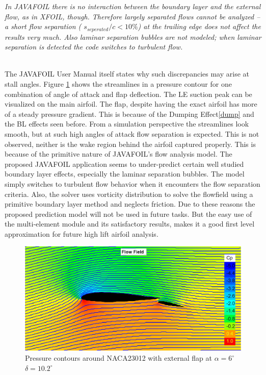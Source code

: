\documentclass[main.tex]{subfiles}
\begin{document}
\vspace{0.35cm}\begin{tcolorbox}[colback=gray!5!white,colframe=gray!75!black]
\textit{In JAVAFOIL there is no interaction between the boundary layer and the external flow, as in XFOIL, though. Therefore largely separated flows cannot be analyzed – a short flow separation ( $s_{seperated}/c < 10\% $) at the trailing edge does not affect the results very much. Also laminar separation bubbles are not modeled; when laminar separation is detected the code switches to turbulent flow.}
\label{JAVAFOIL}
\end{tcolorbox}
\vspace{0.35cm}
\\The JAVAFOIL User Manual\cite{JAVAFOIL_User_Guide} itself states why such discrepancies may arise at stall angles. Figure \ref{fig6} shows the streamlines in a pressure contour for one combination of angle of attack and flap deflection. The LE suction peak can be visualized on the main airfoil. The flap, despite having the exact airfoil has more of a steady pressure gradient. This is because of the Dumping Effect\ref{dump} and the BL effects seen before. From a simulation perspective the streamlines look smooth, but at such high angles of attack flow separation is expected. This is not observed, neither is the wake region behind the airfoil captured properly. This is because of the primitive nature of JAVAFOIL's flow analysis model. The proposed JAVAFOIL application seems to under-predict certain well studied boundary layer effects, especially the laminar separation bubbles. The model simply switches to turbulent flow behavior when it encounters the flow separation criteria. Also, the solver uses vorticity distribution to solve the flowfield using a primitive boundary layer method and neglects friction. Due to these reasons the proposed prediction model will not be used in future tasks. But the easy use of the multi-element module and its satisfactory results, makes it a good first level approximation for future high lift airfoil analysis. \\

\begin{figure}[t]
\centering
\includegraphics[width=1\textwidth]{./Images/Ass4/Alpha6_FlapDef10_2_Contours}
\caption{Pressure contours around NACA23012 with external flap at $\alpha=6^{\circ}$ $\delta=10.2^{\circ}$}
\label{fig6}
\end{figure}
\end{document}
